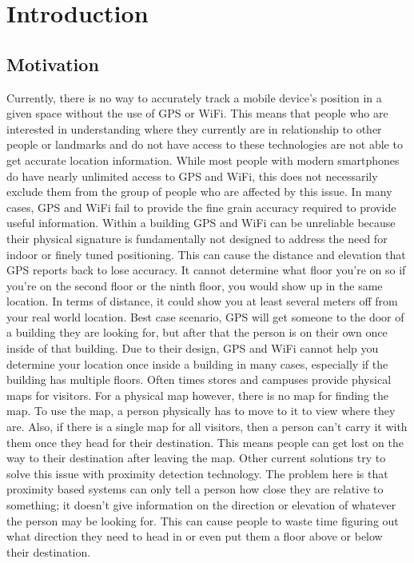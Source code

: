 \chapter{Introduction}

\section{Motivation}

Currently, there is no way to accurately track a mobile device’s position in a given space without the use of GPS or WiFi.
This means that people who are interested in understanding where they currently are in relationship to other people or landmarks and do
not have access to these technologies are not able to get accurate location information.
While most people with modern smartphones do have nearly unlimited access to GPS and WiFi, this does not necessarily exclude them
from the group of people who are affected by this issue.  In many cases, GPS and WiFi fail to provide the fine grain accuracy required
to provide useful information.  Within a building GPS and WiFi can be unreliable because their physical signature is fundamentally not
designed to address the need for indoor or finely tuned positioning. This can cause the distance and elevation that GPS reports back to
lose accuracy. It cannot determine what floor you’re on so if you’re on the second floor or the ninth floor, you would show up in the
same location. In terms of distance, it could show you at least several meters off from your real world location.
Best case scenario, GPS will get someone to the door of a building they are looking for, but after that the person is on their own once
inside of that building. Due to their design, GPS and WiFi cannot help you determine your location once inside a building in many cases,
especially if the building has multiple floors. Often times stores and campuses provide physical maps for visitors. For a physical map
however, there is no map for finding the map. To use the map, a person physically has to move to it to view where they are. Also, if
there is a single map for all visitors, then a person can’t carry it with them once they head for their destination. This means people
can get lost on the way to their destination after leaving the map. Other current solutions try to solve this issue with proximity
detection technology. The problem here is that proximity based systems can only tell a person how close they are relative to something;
it doesn’t give information on the direction or elevation of whatever the person may be looking for. This can cause people to waste time
figuring out what direction they need to head in or even put them a floor above or below their destination.

